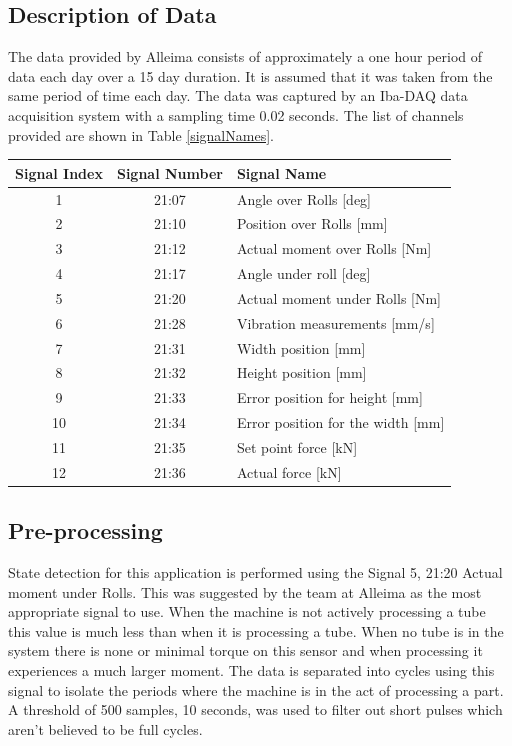 \documentclass[]{article}
\begin{document}
\subsection{Description of Data}
The data provided by Alleima consists of approximately a one hour period of data each day over a 15 day duration. It is assumed that it was taken from the same period of time each day. The data was captured by an Iba-DAQ data acquisition system with a sampling time 0.02 seconds. The list of channels provided are shown in Table \ref{signalNames}.
\begin{center}
\label{signalNames}
\begin{tabular}{ |c|c|l| }
 \hline
Signal Index & Signal Number & Signal Name \\ 
 \hline
1 & 21:07 & Angle over Rolls [deg] \\
 \hline
2 & 21:10 & Position over Rolls [mm] \\
 \hline
3 & 21:12 & Actual moment over Rolls [Nm] \\
 \hline
4 & 21:17 & Angle under roll [deg] \\
 \hline
5 & 21:20 & Actual moment under Rolls [Nm] \\
 \hline
6 & 21:28 & Vibration measurements [mm/s] \\ 
 \hline              
7 & 21:31 & Width position [mm] \\
 \hline
8 & 21:32 & Height position [mm] \\
 \hline
9 & 21:33 & Error position for height [mm] \\
 \hline
10 & 21:34 & Error position for the width [mm] \\
 \hline
11 & 21:35 & Set point force [kN] \\
 \hline
12 & 21:36 & Actual force [kN] \\
 \hline
\end{tabular}
\end{center}

\subsection{Pre-processing}
State detection for this application is performed using the Signal 5, 21:20 Actual moment under Rolls. This was suggested by the team at Alleima as the most appropriate signal to use. When the machine is not actively processing a tube this value is much less than when it is processing a tube. When no tube is in the system there is none or minimal torque on this sensor and when processing it experiences a much larger moment. The data is separated into cycles using this signal to isolate the periods where the machine is in the act of processing a part. A threshold of 500 samples, 10 seconds, was used to filter out short pulses which aren't believed to be full cycles.
\end{document}
